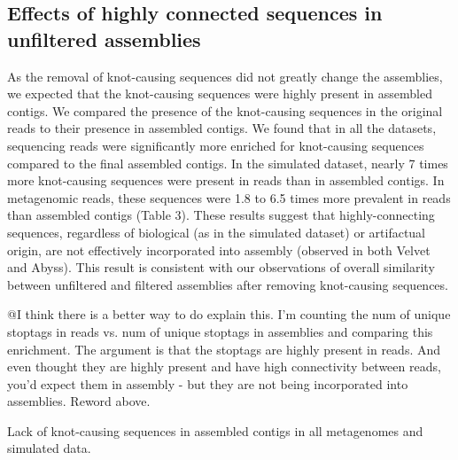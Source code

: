 \documentclass[11pt]{article} %
\begin{document}
\subsection{Effects of highly connected sequences in unfiltered assemblies}
As the removal of knot-causing sequences did not greatly change the assemblies, we expected that the knot-causing sequences were highly present in assembled contigs.  We compared the presence of the knot-causing sequences in the original reads to their presence in assembled contigs.  We found that in all the datasets, sequencing reads were significantly more enriched for knot-causing sequences compared to the final assembled contigs. In the simulated dataset, nearly 7 times more knot-causing sequences were present in reads than in assembled contigs. In metagenomic reads, these sequences were 1.8 to 6.5 times more prevalent in reads than assembled contigs (Table 3).  These results suggest that highly-connecting sequences, regardless of biological (as in the simulated dataset) or artifactual origin, are not effectively incorporated into assembly (observed in both Velvet and Abyss).  This result is consistent with our observations of overall similarity between unfiltered and filtered assemblies after removing knot-causing sequences.  


@I think there is a better way to do explain this.  I'm counting the num of unique stoptags in reads vs. num of unique stoptags in assemblies and comparing this enrichment.  The argument is that the stoptags are highly present in reads.  And even thought they are highly present and have high connectivity between reads, you'd expect them in assembly -  but they are not being incorporated into assemblies.  Reword above.


\begin{table}
\caption{Lack of knot-causing sequences in assembled contigs in all metagenomes and simulated data.}
\end{table}
\end{document}
